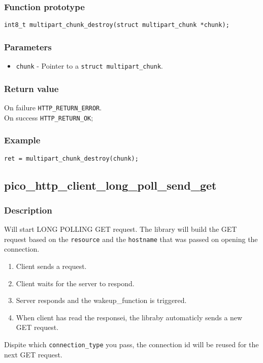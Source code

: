 \subsubsection*{Function prototype}
\texttt{int8\_t multipart\_chunk\_destroy(struct multipart\_chunk *chunk);}

\subsubsection*{Parameters}
\begin{itemize}[noitemsep]
\item \texttt{chunk} - Pointer to a \texttt{struct multipart\_chunk}.
\end{itemize}
\subsubsection*{Return value}
On failure \texttt{HTTP\_RETURN\_ERROR}.
\\On success \texttt{HTTP\_RETURN\_OK};
\subsubsection*{Example}
\begin{verbatim}
ret = multipart_chunk_destroy(chunk);
\end{verbatim}



\subsection{pico\_http\_client\_long\_poll\_send\_get}

\subsubsection*{Description}
Will start LONG POLLING GET request. The library will build the GET request based on the \texttt{resource} and the \texttt{hostname} that was passed on opening the connection. 
\begin{enumerate}
\item Client sends a request.
\item Client waits for the server to respond.
\item Server responds and the wakeup\_function is triggered.
\item When client has read the responsei, the libraby automaticly sends a new GET request.
\end{enumerate}
Dispite which \texttt{connection\_type} you pass, the connection id will be reused for the next GET request.
